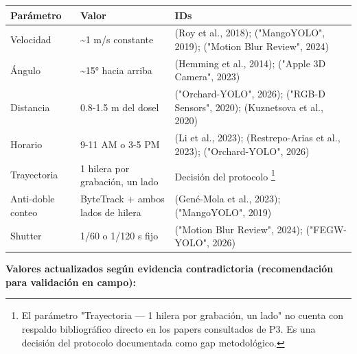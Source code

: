 \begin{tabular}{lll}
\hline
Parámetro & Valor & IDs \\
\hline
Velocidad & \textasciitilde{}1 m/s constante & (Roy et al., 2018); ("MangoYOLO", 2019); ("Motion Blur Review", 2024) \\
Ángulo & \textasciitilde{}15° hacia arriba & (Hemming et al., 2014); ("Apple 3D Camera", 2023) \\
Distancia & 0.8-1.5 m del dosel & ("Orchard-YOLO", 2026); ("RGB-D Sensors", 2020); (Kuznetsova et al., 2020) \\
Horario & 9-11 AM o 3-5 PM & (Li et al., 2023); (Restrepo-Arias et al., 2023); ("Orchard-YOLO", 2026) \\
Trayectoria & 1 hilera por grabación, un lado & Decisión del protocolo \footnote{El parámetro "Trayectoria — 1 hilera por grabación, un lado" no cuenta con respaldo bibliográfico directo en los papers consultados de P3. Es una decisión del protocolo documentada como gap metodológico.} \\
Anti-doble conteo & ByteTrack + ambos lados de hilera & (Gené-Mola et al., 2023); ("MangoYOLO", 2019) \\
Shutter & 1/60 o 1/120 s fijo & ("Motion Blur Review", 2024); ("FEGW-YOLO", 2026) \\
\hline
\end{tabular}



\textbf{Valores actualizados según evidencia contradictoria (recomendación para validación en campo):}



